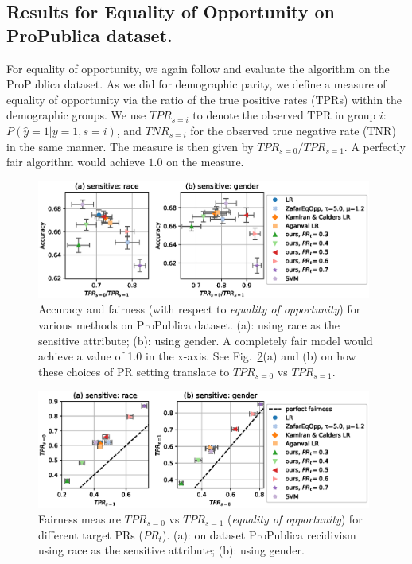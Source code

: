 \subsection{Results for Equality of Opportunity on ProPublica dataset.}\label{sssec:eqoppresults}
%
For equality of opportunity,
we again follow \citet{zafar2017fairnesstreatment} and evaluate the algorithm on the ProPublica dataset.
As we did for demographic parity,
we define a measure of equality of opportunity via the ratio of the true positive rates (TPRs) within the demographic groups.
We use $\mathit{TPR}_{s=i}$ to denote the observed TPR in group $i$: $P(\hat{y}=1|y=1, s=i)$,
and $\mathit{TNR}_{s=i}$ for the observed true negative rate (TNR) in the same manner.
The measure is then given by $\mathit{TPR}_{s=0} / \mathit{TPR}_{s=1}$.
A perfectly fair algorithm would achieve $1.0$ on the measure.
\begin{figure}[t]
  \centering
  \includegraphics[width=0.98\textwidth]{./figures/propublica_opp_box_with_agarwal.eps}
  \caption{Accuracy and fairness (with respect to \emph{equality of opportunity}) for various methods on ProPublica dataset.
    (a): using race as the sensitive attribute; (b): using gender.
    A completely fair model would achieve a value of 1.0 in the x-axis.
    See Fig.~\ref{fig:propublica_opp_scatter_tpr}(a) and (b) on how these choices of PR setting translate to
    $\mathit{TPR}_{s=0}$ vs $\mathit{TPR}_{s=1}$. %
  }%
  \label{fig:propublica_opp_box}
\end{figure}
\begin{figure}[!ht]
  \centering
  \includegraphics[width=0.98\textwidth]{./figures/propublica_opp_scatter_tpr.eps}
  \caption{%
    Fairness measure $\mathit{TPR}_{s=0}$ vs $\mathit{TPR}_{s=1}$ (\emph{equality of opportunity}) for different target PRs ($\mathit{PR}_t$).
    (a): on dataset ProPublica recidivism using race as the sensitive attribute;
    (b): using gender.
  }%
  \label{fig:propublica_opp_scatter_tpr}
\end{figure}

